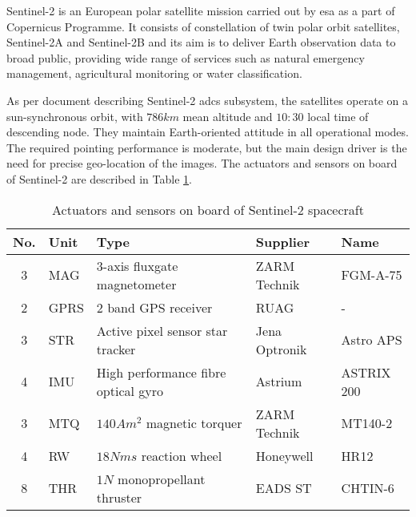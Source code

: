         Sentinel-2 is an European polar satellite mission carried out by \ac{esa} as a part of Copernicus Programme. It consists of constellation of twin polar orbit satellites, Sentinel-2A and Sentinel-2B and its aim is to deliver Earth observation data to broad public, providing wide range of services such as natural emergency management, agricultural monitoring or water classification\cite{sentinel2user}.

        As per document describing Sentinel-2 \ac{adcs} subsystem, the satellites operate on a sun-synchronous orbit, with $786km$ mean altitude and $10:30$ local time of descending node. They maintain Earth-oriented attitude in all operational modes. The required pointing performance is moderate, but the main design driver is the need for precise geo-location of the images\cite{wiedermann2014sentinel}. The actuators and sensors on board of Sentinel-2 are described in Table \ref{table:sentinel-adcs}.

            
        \begin{table}    
            \small
            \begin{tabularx}{\textwidth}{ c l X l l }
                \textbf{No.} & \textbf{Uni}t & \textbf{Type} & \textbf{Supplier} & \textbf{Name} \\[0.1cm]\hline
                \rule{0pt}{1.2\normalbaselineskip}3 & MAG & 3-axis fluxgate magnetometer & ZARM Technik & FGM-A-75 \\
                2 & GPRS & 2 band GPS receiver & RUAG & - \\
                3 & STR  & Active pixel sensor star tracker & Jena Optronik & Astro APS \\
                4 & IMU & High performance fibre optical gyro & Astrium & ASTRIX 200 \\
                3 & MTQ & $140 Am^2$ magnetic torquer & ZARM Technik & MT140-2\\
                4 & RW & $18 Nms$ reaction wheel & Honeywell & HR12 \\
                8 & THR & $1N$ monopropellant thruster & EADS ST &CHTIN-6
            \end{tabularx}
            \caption{Actuators and sensors on board of Sentinel-2 spacecraft\cite{wiedermann2014sentinel}}\label{table:sentinel-adcs}
        \end{table}

